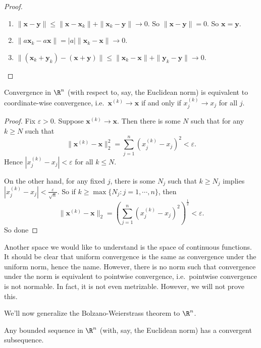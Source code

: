 \documentclass[a4paper]{article}
\begin{document}
\begin{proof}\leavevmode
  \begin{enumerate}
    \item $\|\mathbf{x} - \mathbf{y}\| \leq \|\mathbf{x} - \mathbf{x}_k\| + \|\mathbf{x}_k - \mathbf{y}\| \to 0$. So $\|\mathbf{x} - \mathbf{y}\| = 0$. So $\mathbf{x} = \mathbf{y}$.
    \item $\|a \mathbf{x}_k - a \mathbf{x}\| = |a|\|\mathbf{x}_k - \mathbf{x}\| \to 0$.
  \item $\|(\mathbf{x}_k + \mathbf{y}_k) - (\mathbf{x} + \mathbf{y})\| \leq \|\mathbf{x}_k - \mathbf{x}\| + \|\mathbf{y}_k - \mathbf{y}\| \to 0$.
  \end{enumerate}
\end{proof}

\begin{prop}
  Convergence in $\R^n$ (with respect to, say, the Euclidean norm) is equivalent to coordinate-wise convergence, i.e.\ $\mathbf{x}^{(k)} \to \mathbf{x}$ if and only if $x^{(k)}_j \to x_j$ for all $j$.
\end{prop}

\begin{proof}
  Fix $\varepsilon > 0$. Suppose $\mathbf{x}^{(k)} \to \mathbf{x}$. Then there is some $N$ such that for any $k \geq N$ such that
  \[
    \|\mathbf{x}^{(k)} - \mathbf{x}\|_2^2 = \sum_{j = 1}^n (x_j^{(k)} - x_j)^2 < \varepsilon.
  \]
  Hence $|x_j^{(k)} - x_j| < \varepsilon$ for all $k \leq N$.

  On the other hand, for any fixed $j$, there is some $N_j$ such that $k \geq N_j$ implies $|x_j^{(k)} - x_j| < \frac{\varepsilon}{\sqrt{n}}$. So if $k \geq \max\{N_j: j = 1, \cdots, n\}$, then
  \[
    \|\mathbf{x}^{(k)} - \mathbf{x}\|_2 = \left(\sum_{j = 1}^n (x_j^{(k)} - x_j)^2\right)^{\frac{1}{2}} < \varepsilon.
  \]
  So done
\end{proof}

Another space we would like to understand is the space of continuous functions. It should be clear that uniform convergence is the same as convergence under the uniform norm, hence the name. However, there is no norm such that convergence under the norm is equivalent to pointwise convergence, i.e.\ pointwise convergence is not normable. In fact, it is not even metrizable. However, we will not prove this.

We'll now generalize the Bolzano-Weierstrass theorem to $\R^n$.
\begin{thm}
  Any bounded sequence in $\R^n$ (with, say, the Euclidean norm) has a convergent subsequence.
\end{thm}
\end{document}
